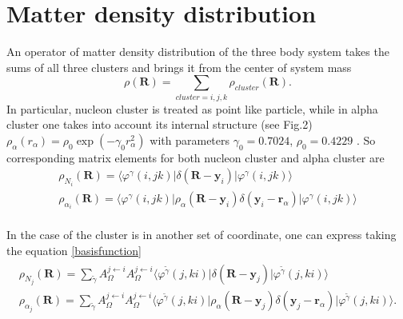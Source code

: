 \documentclass[
12pt, %
oneside, %
english, %
onehalfspacing, %
headsepline, %
]{MastersDoctoralThesis} %
\begin{document}
\section{Matter  density distribution}

An operator of matter density distribution of the three body system takes the sums of all three clusters and brings it from the center of  system mass 
\begin{equation}
\rho(\textbf{R})=\sum_{\scriptscriptstyle{cluster}=i,j,k} \rho_{\scriptscriptstyle cluster}(\textbf{R}) .
\end{equation}
In particular,  nucleon cluster is treated as point like particle, while in alpha cluster  one takes into account its internal structure  (see Fig.2)  $ \displaystyle \rho_\alpha(r_{\alpha})=\rho_0 \exp\left(-\gamma_0 r^2_{\alpha} \right)$ with parameters $ \displaystyle \gamma_0= 0.7024$, $  \displaystyle \rho_0=0.4229$ \cite{SATCHLER1979}. So corresponding matrix elements for both nucleon cluster and alpha cluster are
\begin{equation}
\label{densities}
\begin{gathered}
\rho_{N_i}(\textbf{R})=
\langle\varphi^{{\gamma}}(i,jk) 
\vert \delta(\textbf{R}-\textbf{y}_i)
\vert \varphi^{{\gamma}}(i,jk)\rangle \\
\rho_{\alpha_i}(\textbf{R})= 
\langle\varphi^{{\gamma}}(i,jk) 
\vert \rho_{\alpha}(\textbf{R}-\textbf{y}_i) \delta(\textbf{y}_i-\textbf{r}_\alpha)
\vert \varphi^{{\gamma}}(i,jk)\rangle \\
\end{gathered}
\end{equation}


In the case of the cluster is in another set of coordinate, one can express taking the equation \eqref{basisfunction}
\begin{align*}
\begin{gathered}
\rho_{N_j}(\textbf{R})=
\sum_{  \widetilde{ \gamma }     } A_{\Omega}^{j \leftarrow i}  A_{\Omega}^{j \leftarrow i} 
\langle \varphi^{ \widetilde{\gamma} }(j,ki) 
\vert \delta(\textbf{R}-\textbf{y}_j)
\vert \varphi^{\widetilde{\gamma}}(j,ki)\rangle \\
\rho_{\alpha_j}(\textbf{R})= 
\sum_{  \widetilde{ \gamma }     } A_{\Omega}^{j \leftarrow i}  A_{\Omega}^{j \leftarrow i} 
\langle \varphi^{ \widetilde{\gamma} }(j,ki) 
\vert \rho_{\alpha}(\textbf{R}-\textbf{y}_j) \delta(\textbf{y}_j-\textbf{r}_{\alpha})
\vert \varphi^{\widetilde{\gamma}}(j,ki)\rangle.\\
\end{gathered}
\end{align*}
\end{document}
